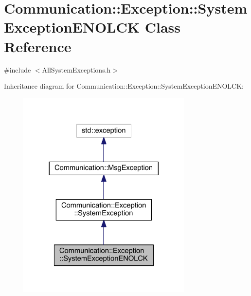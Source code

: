 \hypertarget{class_communication_1_1_exception_1_1_system_exception_e_n_o_l_c_k}{}\section{Communication\+:\+:Exception\+:\+:System\+Exception\+E\+N\+O\+L\+C\+K Class Reference}
\label{class_communication_1_1_exception_1_1_system_exception_e_n_o_l_c_k}


{\ttfamily \#include $<$All\+System\+Exceptions.\+h$>$}



Inheritance diagram for Communication\+:\+:Exception\+:\+:System\+Exception\+E\+N\+O\+L\+C\+K\+:\nopagebreak
\begin{figure}[H]
\begin{center}
\leavevmode
\includegraphics[width=248pt]{class_communication_1_1_exception_1_1_system_exception_e_n_o_l_c_k__inherit__graph}
\end{center}
\end{figure}


